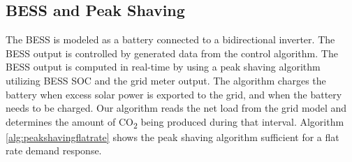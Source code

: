 \documentclass[conference]{IEEEtran}
\begin{document}
    \subsection{BESS and Peak Shaving}
    	The BESS is modeled as a battery connected to a bidirectional inverter. The BESS output is controlled by generated data from the control algorithm. The BESS output is computed in real-time by using a peak shaving algorithm utilizing  BESS SOC and the grid meter output. The algorithm charges the battery when excess solar power is exported to the grid, and when the battery needs to be charged. Our algorithm reads the net load from the grid  model and determines the amount of CO\textsubscript{2} being produced during that interval.  Algorithm \ref{alg:peakshavingflatrate} shows the peak shaving algorithm sufficient for a flat rate demand response. 
\end{document}
